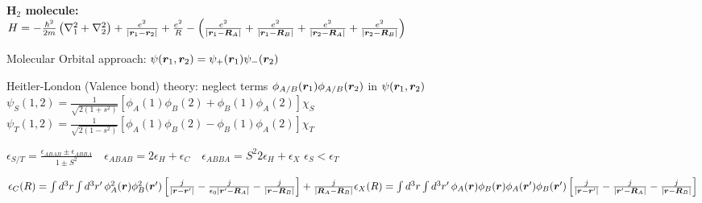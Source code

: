 \begin{squishlist}
    \item \textbf{H$_2$ molecule:} \\
    $H = -\frac{\hbar^2}{2m}\left(\nabla_1^2 + \nabla_2^2\right) + \frac{e^2}{|\vr_1 - \vr_2|} + \frac{e^2}{R} - \left(\frac{e^2}{|\vr_1 - \vR_A|} + \frac{e^2}{|\vr_1 - \vR_B|} + \frac{e^2}{|\vr_2 - \vR_A|} + \frac{e^2}{|\vr_2 - \vR_B|}\right)$
    \item Molecular Orbital approach: $\psi(\vr_1,\vr_2) = \psi_+(\vr_1)\psi_-(\vr_2)$
    
    \item Heitler-London (Valence bond) theory: neglect terms $\phi_{A/B}(\vr_1)\phi_{A/B}(\vr_2)$ in $\psi(\vr_1, \vr_2)$ \\
    $\psi_S(1,2) = \frac{1}{\sqrt{2(1+s^2)}} \left[\phi_A(1)\phi_B(2) + \phi_B(1)\phi_A(2)\right] \chi_S$ \\
    $\psi_T(1,2) = \frac{1}{\sqrt{2(1-s^2)}} \left[\phi_A(1)\phi_B(2) - \phi_B(1)\phi_A(2)\right] \chi_T$
    \item $\epsilon_{S/T} = \frac{\epsilon_{ABAB} \pm \epsilon_{ABBA}}{1 \pm S^2} \quad \epsilon_{ABAB} = 2 \epsilon_H + \epsilon_C \quad \epsilon_{ABBA} = S^2 2 \epsilon_H + \epsilon_{X}$ \qquad $\epsilon_S < \epsilon_T$
    \item $\epsilon_C(R) = \int d^3r \int d^3r' \, \phi_A^2 (\vec{r}) \phi_B^2 (\vec{r}') \left[ \frac{j}{|\vec{r} - \vec{r}'|}  - \frac{j}{\epsilon_0|\vec{r}' - \vec{R}_A|} - \frac{j}{|\vec{r} - \vec{R}_B|} \right]  + \frac{j}{|\vec{R}_A - \vec{R}_B|}\\
    \epsilon_{X}(R) = \int d^3r \int d^3r' \, \phi_A (\vec{r}) \phi_B (\vec{r}) \phi_A (\vec{r}') \phi_B (\vec{r}')  \left[ \frac{j}{|\vec{r} - \vec{r}'|}  - \frac{j}{|\vec{r}' - \vec{R}_A|}  - \frac{j}{|\vec{r} - \vec{R}_B|} \right]$
\end{squishlist}

\squishline

